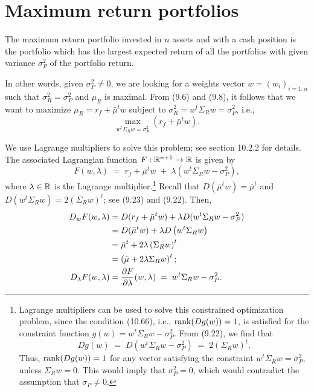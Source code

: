 %

\section{Maximum return portfolios}

The maximum return portfolio invested in $n$ assets and with a cash position is the
portfolio which has the largest expected return of all the portfolios with given
variance $\sigma_P^2$ of the portfolio return.

In other words, given $\sigma_P^2 \neq 0$, we are looking for a weights vector $w =
(w_i)_{i=1:n}$ such that $\sigma_R^2 = \sigma_P^2$ and $\mu_R$ is maximal. From (9.6)
and (9.8), it follows that we want to maximize $\mu_R = r_f + \bar\mu^tw$ subject to
$\sigma_R^2 = w^t\Sigma_Rw = \sigma_P^2$, i.e.,
\begin{equation}
\max_{w^t\Sigma_Rw=\sigma_P^2} \left(r_f+\bar\mu^tw\right).
\end{equation}

We use Lagrange multipliers to solve this problem; see section 10.2.2 for details.
The associated Lagrangian function $F:\mathbb{R}^{n+1}\to\mathbb{R}$ is given by
\[
F(w,\lambda) \;=\; r_f+\bar\mu^tw \;+\; \lambda(w^t\Sigma_Rw-\sigma_P^2),
\]
where $\lambda\in\mathbb{R}$ is the Lagrange multiplier.\footnote{Lagrange multipliers can be
used to solve this constrained optimization problem, since the condition (10.66),
i.e., $\operatorname{rank}(Dg(w))=1$, is satisfied for the constraint function $g(w) =
w^t\Sigma_Rw-\sigma_P^2$. From (9.22), we find that
\[
Dg(w) \;=\; D(w^t\Sigma_Rw-\sigma_P^2) \;=\; 2(\Sigma_Rw)^t.
\]
Thus, $\operatorname{rank}(Dg(w))=1$ for any vector satisfying the constraint $w^t\Sigma_Rw =
\sigma_P^2$, unless $\Sigma_Rw = 0$. This would imply that $\sigma_P^2 = 0$, which
would contradict the assumption that $\sigma_P \neq 0$.} Recall that
$D(\bar\mu^tw)=\bar\mu^t$ and $D\left(w^t\Sigma_Rw\right) = 2(\Sigma_Rw)^t$; see
(9.23) and (9.22). Then,
\begin{align}
D_wF(w,\lambda) &= D(r_f+\bar\mu^tw)+\lambda D(w^t\Sigma_Rw-\sigma_P^2) \notag\\
&= D(\bar\mu^tw)+\lambda D\left(w^t\Sigma_Rw\right) \notag\\
&= \bar\mu^t+2\lambda\left(\Sigma_Rw\right)^t \notag\\
&= \left(\bar\mu+2\lambda\Sigma_Rw\right)^t; \\
D_\lambda F(w,\lambda) &= \frac{\partial F}{\partial \lambda}(w,\lambda) \;=\; w^t\Sigma_Rw-\sigma_P^2.
\end{align}

